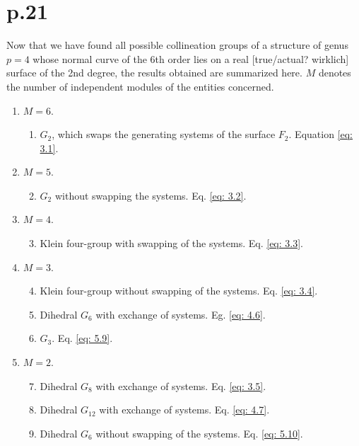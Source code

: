 \documentclass[leqno]{article}
\begin{document}
\section{p.21}
Now that we have found all possible collineation groups of a structure of genus $p=4$ whose normal curve of the 6th order lies on a real [true/actual? wirklich] surface of the 2nd degree, the results obtained are summarized here. $M$ denotes the number of independent modules of the entities concerned. 
\begin{enumerate}[label=\alph*.]
	\item $M=6$.
	\begin{enumerate}[label=\arabic*)]
		\item $G_2$, which swaps the generating systems of the surface $F_2$. Equation \eqref{eq: 3.1}.
	\end{enumerate}
    \item $M=5$.
    \begin{enumerate}[label=\arabic*)]
    	\setcounter{enumii}{1}
    	\item $G_2$ without swapping the systems. Eq. \eqref{eq: 3.2}.
    \end{enumerate}
    \item $M=4$.
    \begin{enumerate}[label=\arabic*)]
    	\setcounter{enumii}{2}
    	\item Klein four-group with swapping of the systems. Eq. \eqref{eq: 3.3}.
    \end{enumerate}
    \item $M=3$.
    \begin{enumerate}[label=\arabic*)]
    	\setcounter{enumii}{3}
    	\item Klein four-group without swapping of the systems. Eq. \eqref{eq: 3.4}.
    	\item Dihedral $G_6$ with exchange of systems. Eg. \eqref{eq: 4.6}. 
    	\item $G_3$. Eq. \eqref{eq: 5.9}.
    \end{enumerate}
    \item $M=2$.
    \begin{enumerate}[label=\arabic*)]
    	\setcounter{enumii}{6}
    	\item Dihedral $G_8$ with exchange of systems. Eq. \eqref{eq: 3.5}.
    	\item Dihedral $G_{12}$ with exchange of systems. Eq. \eqref{eq: 4.7}.  
    	\item Dihedral $G_6$ without swapping of the systems. Eq. \eqref{eq: 5.10}.

\end{enumerate}
\end{enumerate}
\end{document}
